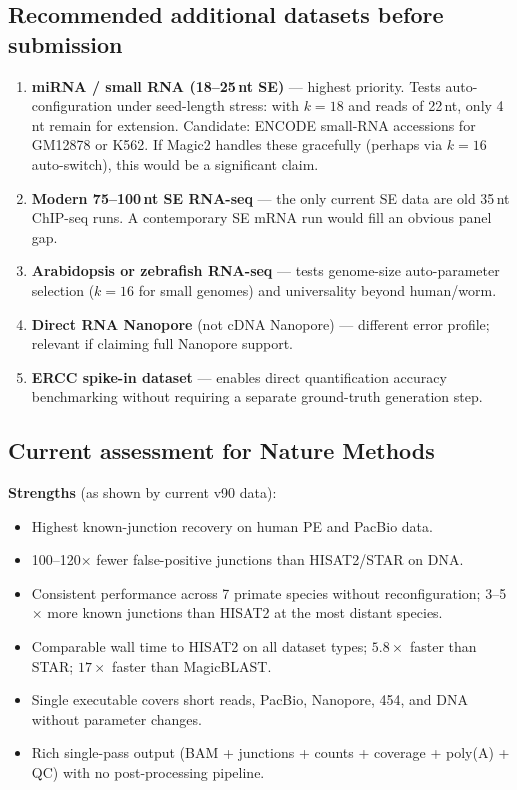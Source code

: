\documentclass[11pt]{article}
\begin{document}
\subsection*{Recommended additional datasets before submission}

\begin{enumerate}
\item \textbf{miRNA / small RNA (18--25\,nt SE)} — highest priority.
  Tests auto-configuration under seed-length stress: with $k=18$ and
  reads of 22\,nt, only 4\,nt remain for extension.
  Candidate: ENCODE small-RNA accessions for GM12878 or K562.
  If Magic2 handles these gracefully (perhaps via $k=16$ auto-switch),
  this would be a significant claim.

\item \textbf{Modern 75--100\,nt SE RNA-seq} — the only current SE data
  are old 35\,nt ChIP-seq runs.
  A contemporary SE mRNA run would fill an obvious panel gap.

\item \textbf{Arabidopsis or zebrafish RNA-seq} — tests genome-size
  auto-parameter selection ($k=16$ for small genomes) and universality
  beyond human/worm.

\item \textbf{Direct RNA Nanopore} (not cDNA Nanopore) — different
  error profile; relevant if claiming full Nanopore support.

\item \textbf{ERCC spike-in dataset} — enables direct quantification
  accuracy benchmarking without requiring a separate ground-truth
  generation step.
\end{enumerate}

\subsection*{Current assessment for Nature Methods}

\textbf{Strengths} (as shown by current v90 data):
\begin{itemize}
  \item Highest known-junction recovery on human PE and PacBio data.
  \item 100--120$\times$ fewer false-positive junctions than HISAT2/STAR on DNA.
  \item Consistent performance across 7 primate species without
    reconfiguration; 3--5$\times$ more known junctions than HISAT2 at the
    most distant species.
  \item Comparable wall time to HISAT2 on all dataset types; $5.8\times$
    faster than STAR; $17\times$ faster than MagicBLAST.
  \item Single executable covers short reads, PacBio, Nanopore, 454,
    and DNA without parameter changes.
  \item Rich single-pass output (BAM + junctions + counts + coverage +
    poly(A) + QC) with no post-processing pipeline.
\end{itemize}
\end{document}
